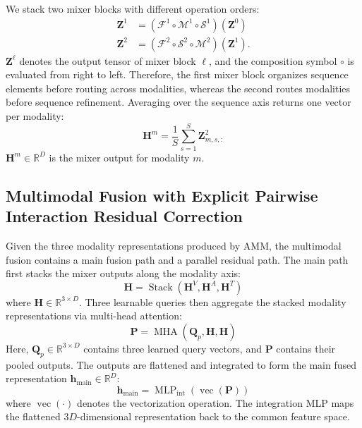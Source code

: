 \documentclass[letterpaper]{article} %
\begin{document}
We stack two mixer blocks with different operation orders:
\begin{equation}
\begin{aligned}
\mathbf{Z}^{1}
&=(\mathcal{F}^{1}\circ\mathcal{M}^{1}\circ\mathcal{S}^{1})
  (\mathbf{Z}^{0}) \\
\mathbf{Z}^{2}
&=(\mathcal{F}^{2}\circ\mathcal{S}^{2}\circ\mathcal{M}^{2})
  (\mathbf{Z}^{1}).
\end{aligned}
\label{eq:alternating_blocks}
\end{equation}
$\mathbf{Z}^{\ell}$ denotes the output tensor of mixer block $\ell$,
and the composition symbol $\circ$ is evaluated from right to left.
Therefore, the first mixer block organizes sequence elements before routing
across modalities, whereas the second routes modalities before sequence
refinement. Averaging over the sequence axis returns one vector per
modality:
\begin{equation}
\mathbf{H}^{m}=\frac{1}{S}\sum_{s=1}^{S}\mathbf{Z}^{2}_{m,s,:}
\label{eq:mixer_output}
\end{equation}
$\mathbf{H}^{m}\in\mathbb{R}^{D}$ is the mixer output for modality $m$.


\subsection{Multimodal Fusion with Explicit Pairwise Interaction Residual Correction}

Given the three modality representations produced by AMM, the
multimodal fusion contains a main fusion path and a parallel
residual path. The main path first stacks the mixer outputs along the
modality axis:
\begin{equation}
\mathbf{H}
=\operatorname{Stack}
  (\mathbf{H}^{V},
   \mathbf{H}^{A},
   \mathbf{H}^{T})
\label{eq:stacked_mixer_output}
\end{equation}
where $\mathbf{H}\in\mathbb{R}^{3\times D}$. Three learnable queries then aggregate the stacked modality representations via multi-head attention:
\begin{equation}
\mathbf{P}
=\operatorname{MHA}
  (\mathbf{Q}_{p},\mathbf{H},
   \mathbf{H})
\end{equation}
Here, $\mathbf{Q}_{p}\in\mathbb{R}^{3\times D}$ contains three learned
query vectors, and $\mathbf{P}$ contains their pooled outputs. The
outputs are flattened and integrated to form the main fused
representation $\mathbf{h}_{\mathrm{main}}\in\mathbb{R}^{D}$:
\begin{equation}
\mathbf{h}_{\mathrm{main}}
=\operatorname{MLP}_{\mathrm{int}}
  (\operatorname{vec}(\mathbf{P}))
\label{eq:main_fusion}
\end{equation}
where $\operatorname{vec}(\cdot)$ denotes the vectorization operation.
The integration MLP maps the flattened $3D$-dimensional representation
back to the common feature space.
\end{document}
